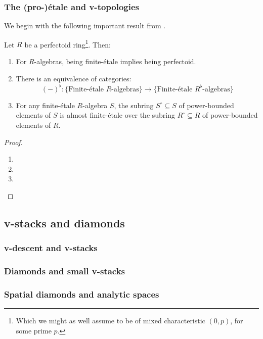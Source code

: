         \subsubsection{The (pro-)\'etale and v-topologies}
            We begin with the following important result from \cite{scholze2011perfectoid}.
            \begin{theorem} \label{theorem: almost_purity_perfectoid_version}
                Let $R$ be a perfectoid ring\footnote{Which we might as well assume to be of mixed characteristic $(0, p)$, for some prime $p$.}. Then:
                    \begin{enumerate}
                        \item For $R$-algebras, being finite-\'etale implies being perfectoid.
                        \item There is an equivalence of categories:
                            $$(-)^{\flat}: \{\text{Finite-\'etale $R$-algebras}\} \to \{\text{Finite-\'etale $R^{\flat}$-algebras}\}$$
                        \item For any finite-\'etale $R$-algebra $S$, the subring $S^{\circ} \subseteq S$ of power-bounded elements of $S$ is almost finite-\'etale over the subring $R^{\circ} \subseteq R$ of power-bounded elements of $R$.
                    \end{enumerate}
            \end{theorem}
                \begin{proof}
                    \noindent
                    \begin{enumerate}
                        \item 
                        \item 
                        \item 
                    \end{enumerate}
                \end{proof}
    
    \subsection{v-stacks and diamonds}
        \subsubsection{v-descent and v-stacks}
        
        \subsubsection{Diamonds and small v-stacks}
        
        \subsubsection{Spatial diamonds and analytic spaces}